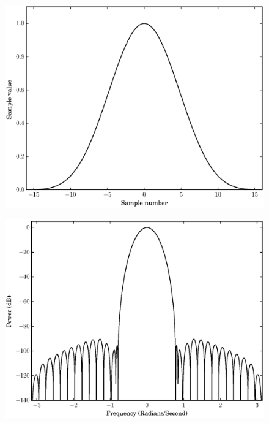 \begin{figure}[!t]
    \centering
    \includegraphics[width=\figwidthscale\textwidth]{plots/c1_blackman_td.eps}
    \CaptionWithTitle{%
    }{}
\end{figure}

\begin{figure}[!t]
    \centering
    \includegraphics[width=\figwidthscale\textwidth]{plots/c1_blackman_fd.eps}
    \CaptionWithTitle{%
    }{}
\end{figure}

